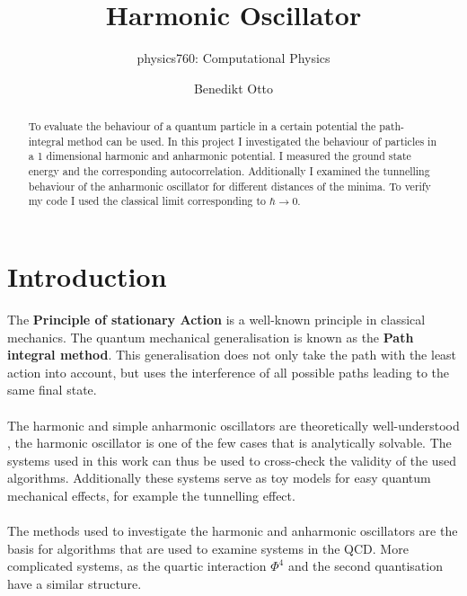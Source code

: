 \documentclass{scrartcl}
\title{Harmonic Oscillator}
\author{Benedikt Otto}
\subtitle{physics760: Computational Physics}
\begin{document}
	\maketitle
	\newpage
	\tableofcontents
	\newpage
	\begin{abstract}
		To evaluate the behaviour of a quantum particle in a certain potential the path-integral method can be used.
		In this project I investigated the behaviour of particles in a 1 dimensional harmonic and anharmonic potential.
		I measured the ground state energy and the corresponding autocorrelation.
		Additionally I examined the tunnelling behaviour of the anharmonic oscillator for different distances of the minima.
		To verify my code I used the classical limit corresponding to $\hbar \rightarrow 0$.
	\end{abstract}
	\section{Introduction}
		The \textbf{Principle of stationary Action} is a well-known principle in classical mechanics.
		The quantum mechanical generalisation is known as the \textbf{Path integral method}.
		This generalisation does not only take the path with the least action into account, but uses the interference of all possible paths leading to the same final state.
		\\\\
		The harmonic and simple anharmonic oscillators are theoretically well-understood \cite{bender}, the harmonic oscillator is one of the few cases that is analytically solvable.
		The systems used in this work can thus be used to cross-check the validity of the used algorithms.
		Additionally these systems serve as toy models for easy quantum mechanical effects, for example the tunnelling effect.
		\\\\
		The methods used to investigate the harmonic and anharmonic oscillators are the basis for algorithms that are used to examine systems in the QCD.
		More complicated systems, as the quartic interaction $\Phi^4$ and the second quantisation have a similar structure.
\end{document}
